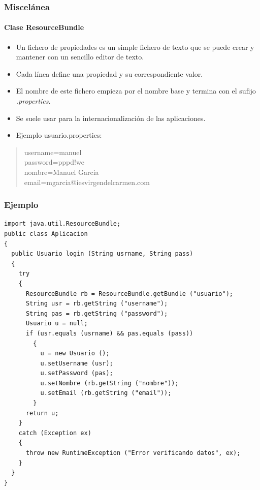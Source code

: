 \documentclass{beamer}
\begin{document}
\begin{frame}
\frametitle{Miscelánea}
\framesubtitle{Clase ResourceBundle}
\begin{itemize}[<+->]
\item Un fichero de propiedades es un simple fichero de texto que se puede crear y mantener con un sencillo editor de texto. 
\item Cada línea define una propiedad y su correspondiente valor.
\item El nombre de este fichero empieza por el nombre base y termina con el sufijo \emph{.properties}.
\item Se suele usar para la internacionalización de las aplicaciones.
\item Ejemplo usuario.properties:
\end{itemize}
\pause
\begin{quote}
username=manuel\\
password=pppd!we\\
nombre=Manuel Garcia\\
email=mgarcia@iesvirgendelcarmen.com
\end{quote}
\end{frame}

\begin{frame}[fragile]
\frametitle{Ejemplo}
\begin{tiny}
\begin{verbatim}
import java.util.ResourceBundle;
public class Aplicacion
{
  public Usuario login (String usrname, String pass)
  {
    try
    {
      ResourceBundle rb = ResourceBundle.getBundle ("usuario");
      String usr = rb.getString ("username");
      String pas = rb.getString ("password");
      Usuario u = null;
      if (usr.equals (usrname) && pas.equals (pass))
        {
          u = new Usuario ();
          u.setUsername (usr);
          u.setPassword (pas);
          u.setNombre (rb.getString ("nombre"));
          u.setEmail (rb.getString ("email"));
        }
      return u;
    }
    catch (Exception ex)
    {
      throw new RuntimeException ("Error verificando datos", ex);
    }
  }
}
\end{verbatim}
\end{tiny}
\end{frame}
\end{document}
